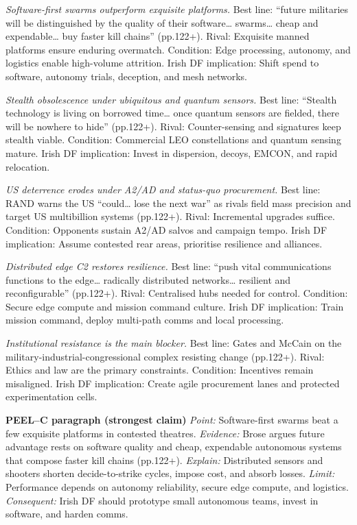 \textit{Software-first swarms outperform exquisite platforms.} Best line: “future militaries will be distinguished by the quality of their software… swarms… cheap and expendable… buy faster kill chains” (pp.122+). Rival: Exquisite manned platforms ensure enduring overmatch. Condition: Edge processing, autonomy, and logistics enable high-volume attrition. Irish DF implication: Shift spend to software, autonomy trials, deception, and mesh networks.

\textit{Stealth obsolescence under ubiquitous and quantum sensors.} Best line: “Stealth technology is living on borrowed time… once quantum sensors are fielded, there will be nowhere to hide” (pp.122+). Rival: Counter-sensing and signatures keep stealth viable. Condition: Commercial LEO constellations and quantum sensing mature. Irish DF implication: Invest in dispersion, decoys, EMCON, and rapid relocation.

\textit{US deterrence erodes under A2/AD and status-quo procurement.} Best line: RAND warns the US “could… lose the next war” as rivals field mass precision and target US multibillion systems (pp.122+). Rival: Incremental upgrades suffice. Condition: Opponents sustain A2/AD salvos and campaign tempo. Irish DF implication: Assume contested rear areas, prioritise resilience and alliances.

\textit{Distributed edge C2 restores resilience.} Best line: “push vital communications functions to the edge… radically distributed networks… resilient and reconfigurable” (pp.122+). Rival: Centralised hubs needed for control. Condition: Secure edge compute and mission command culture. Irish DF implication: Train mission command, deploy multi-path comms and local processing.

\textit{Institutional resistance is the main blocker.} Best line: Gates and McCain on the military-industrial-congressional complex resisting change (pp.122+). Rival: Ethics and law are the primary constraints. Condition: Incentives remain misaligned. Irish DF implication: Create agile procurement lanes and protected experimentation cells.

\textbf{PEEL–C paragraph (strongest claim)}
\textit{Point:} Software-first swarms beat a few exquisite platforms in contested theatres.
\textit{Evidence:} Brose argues future advantage rests on software quality and cheap, expendable autonomous systems that compose faster kill chains (pp.122+).
\textit{Explain:} Distributed sensors and shooters shorten decide-to-strike cycles, impose cost, and absorb losses.
\textit{Limit:} Performance depends on autonomy reliability, secure edge compute, and logistics.
\textit{Consequent:} Irish DF should prototype small autonomous teams, invest in software, and harden comms.

